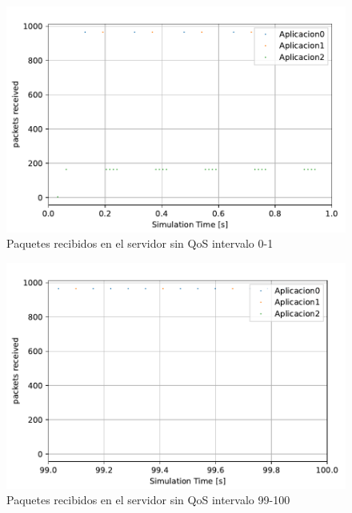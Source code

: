 \begin{figure}
    \centering
    \includegraphics{graficas/sinQoS/packetsReceived_sinQoS_1.pdf}
    \caption{Paquetes recibidos en el servidor sin QoS intervalo 0-1}
    \label{fig:sinqos_pktreceived01}
\end{figure}

\begin{figure}
    \centering
    \includegraphics{graficas/sinQoS/packetsReceived_sinQoS_99.pdf}
    \caption{Paquetes recibidos en el servidor sin QoS intervalo 99-100}
    \label{fig:sinqos_pktreceived99100}
\end{figure}


